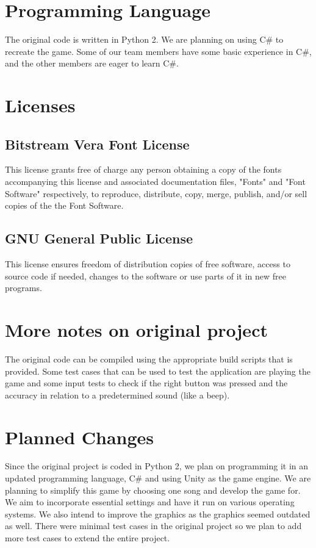 \documentclass{article}
\begin{document}
\section{Programming Language}
The original code is written in Python 2. We are planning on using C\# to recreate the game. Some of our team members have some basic experience in C\#, and the other members are eager to learn C\#.

\section{Licenses}
\subsection{Bitstream Vera Font License}
This license grants free of charge any person obtaining a copy of the fonts accompanying this license and associated documentation files, "Fonts" and "Font Software" respectively, to reproduce, distribute, copy, merge, publish, and/or sell copies of the the Font Software.

\subsection{GNU General Public License} 
This license ensures freedom of distribution copies of free software, access to source code if needed, changes to the software or use parts of it in new free programs.

\section{More notes on original project}
The original code can be compiled using the appropriate build scripts that is provided. Some test cases that can be used to test the application are playing the game and some input tests to check if the right button was pressed and the accuracy in relation to a predetermined sound (like a beep).

\section{Planned Changes}
Since the original project is coded in Python 2, we plan on programming it in an updated programming language, C\# and using Unity as the game engine. We are planning to simplify this game by choosing one song and develop the game for. We aim to incorporate essential settings and have it run on various operating systems. We also intend to improve the graphics as the graphics seemed outdated as well. There were minimal test cases in the original project so we plan to add more test cases to extend the entire project. 
\end{document}
